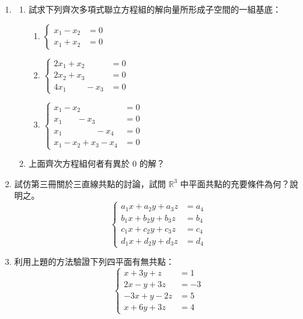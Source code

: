 \begin{enumerate}[label=\arabic*., leftmargin=2em]
  \item[\textbf{*7.}]
  \begin{enumerate}[label=(\alph*)]
    \item 試求下列齊次多項式聯立方程組的解向量所形成子空間的一組基底：
    \begin{enumerate}[label=(\roman*)]
      \item $\left\{\begin{aligned} x_1 - x_2 &= 0 \\ x_1 + x_2 &= 0 \end{aligned}\right.$
      \item $\left\{\begin{aligned}
      2x_1 + x_2 \phantom{+ x_3} &= 0 \\
      2x_2 + x_3 &= 0 \\
      4x_1 \phantom{+ 2x_2} - x_3 &= 0
      \end{aligned}\right.$
      \item $\left\{\begin{aligned}
      x_1 - x_2 \phantom{- x_3 - x_4} &= 0 \\
      x_1 \phantom{- x_2} - x_3 \phantom{- x_4} &= 0 \\
      x_1 \phantom{- x_2 - x_3} - x_4 &= 0 \\
      x_1 - x_2 + x_3 - x_4 &= 0
      \end{aligned}\right.$
    \end{enumerate}
    \item 上面齊次方程組何者有異於 0 的解？
  \end{enumerate}

  \item 試仿第三冊關於三直線共點的討論，試問 $\mathbb{R}^3$ 中平面共點的充要條件為何？說明之。
  \[ \left\{\begin{aligned}
  a_1x + a_2y + a_3z &= a_4 \\
  b_1x + b_2y + b_3z &= b_4 \\
  c_1x + c_2y + c_3z &= c_4 \\
  d_1x + d_2y + d_3z &= d_4
  \end{aligned}\right. \]

  \item 利用上題的方法驗證下列四平面有無共點：
  \[ \left\{\begin{aligned}
  x + 3y + z &= 1 \\
  2x - y + 3z &= -3 \\
  -3x + y - 2z &= 5 \\
  x + 6y + 3z &= 4
  \end{aligned}\right. \]


\end{enumerate}
